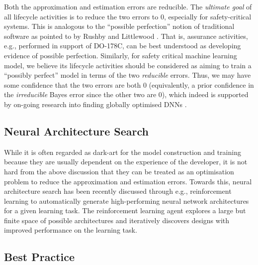 Both the approximation and estimation errors are reducible. The \emph{ultimate goal} of all lifecycle activities is to reduce the two errors to 0, especially for safety-critical systems. This is analogous to the ``possible perfection'' notion of traditional software as pointed to by Rushby and Littlewood \cite{littlewood_reasoning_2012,rushby_software_2009}. That is, assurance activities, e.g., performed in support of DO-178C, can be best understood as developing evidence of possible perfection.
Similarly, for safety critical machine learning model, we believe its lifecycle activities should be considered as aiming
to train a ``possibly perfect'' model in terms of the two \textit{reducible} errors. Thus, we may have some confidence that the two errors are both 0 (equivalently, a prior confidence in the \textit{irreducible} Bayes error since the other two are 0), which indeed is supported by on-going research into 
finding globally optimised DNNs \cite{du_gradient_2018}. 




\subsection*{Neural Architecture Search}

While it is often regarded as dark-art for the  model construction and training because they are usually dependent on the experience of the developer, it is not hard from the above discussion that they can be treated as an optimisation problem to reduce the approximation and estimation errors. 
%
Towards this, neural architecture search \cite{DBLP:journals/corr/ZophL16} has been recently discussed through e.g., 
reinforcement learning to automatically generate high-performing neural network architectures for a given learning task. 
The reinforcement learning agent explores a large but finite space of possible architectures and iteratively discovers designs with improved performance on the learning task. 


\subsection*{Best Practice} 

